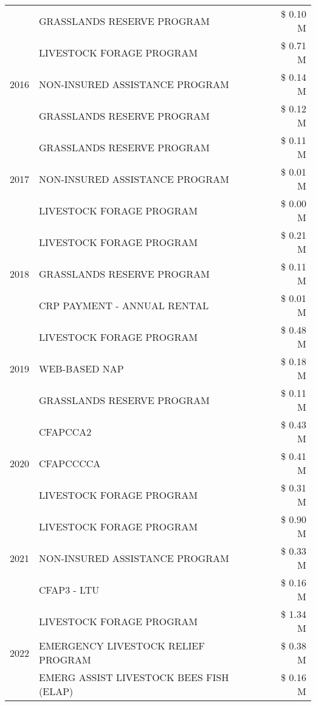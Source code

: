 \begin{tabular}{llr}
 & GRASSLANDS RESERVE PROGRAM & \$ 0.10 M \\
\cline{1-3}
\multirow[t]{3}{*}{2016} & LIVESTOCK FORAGE PROGRAM & \$ 0.71 M \\
 & NON-INSURED ASSISTANCE PROGRAM & \$ 0.14 M \\
 & GRASSLANDS RESERVE PROGRAM & \$ 0.12 M \\
\cline{1-3}
\multirow[t]{3}{*}{2017} & GRASSLANDS RESERVE PROGRAM & \$ 0.11 M \\
 & NON-INSURED ASSISTANCE PROGRAM & \$ 0.01 M \\
 & LIVESTOCK FORAGE PROGRAM & \$ 0.00 M \\
\cline{1-3}
\multirow[t]{3}{*}{2018} & LIVESTOCK FORAGE PROGRAM & \$ 0.21 M \\
 & GRASSLANDS RESERVE PROGRAM & \$ 0.11 M \\
 & CRP PAYMENT - ANNUAL RENTAL & \$ 0.01 M \\
\cline{1-3}
\multirow[t]{3}{*}{2019} & LIVESTOCK FORAGE PROGRAM & \$ 0.48 M \\
 & WEB-BASED NAP & \$ 0.18 M \\
 & GRASSLANDS RESERVE PROGRAM & \$ 0.11 M \\
\cline{1-3}
\multirow[t]{3}{*}{2020} & CFAPCCA2 & \$ 0.43 M \\
 & CFAPCCCCA & \$ 0.41 M \\
 & LIVESTOCK FORAGE PROGRAM & \$ 0.31 M \\
\cline{1-3}
\multirow[t]{3}{*}{2021} & LIVESTOCK FORAGE PROGRAM & \$ 0.90 M \\
 & NON-INSURED ASSISTANCE PROGRAM & \$ 0.33 M \\
 & CFAP3 - LTU & \$ 0.16 M \\
\cline{1-3}
\multirow[t]{3}{*}{2022} & LIVESTOCK FORAGE PROGRAM & \$ 1.34 M \\
 & EMERGENCY LIVESTOCK RELIEF PROGRAM & \$ 0.38 M \\
 & EMERG ASSIST LIVESTOCK BEES FISH (ELAP) & \$ 0.16 M \\
\cline{1-3}
\bottomrule
\end{tabular}
